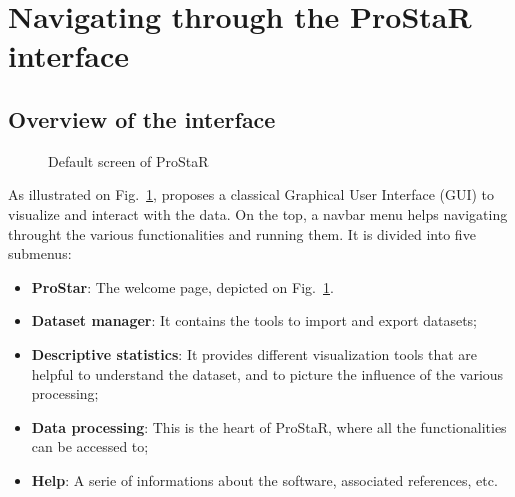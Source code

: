 \documentclass[12pt]{article}
\begin{document}

\section{Navigating through the ProStaR interface}

\subsection{Overview of the interface}

\begin{figure}
\centering
{}
\caption{Default screen of ProStaR}\label{fig:vuegal}
\end{figure}

{As illustrated on Fig.~\ref{fig:vuegal},  proposes a classical 
Graphical User Interface (GUI) to visualize and interact with the data. On 
the top, a navbar menu helps navigating throught the various  
functionalities and running them. It is divided into five submenus:
\begin{itemize}
\item \textbf {ProStar}: The welcome page, depicted on Fig.~\ref{fig:vuegal}.
\item \textbf {Dataset manager}: It contains the tools to import and export 
datasets;
\item \textbf {Descriptive statistics}: It provides different visualization 
tools that are helpful to understand the dataset, and to picture the 
influence of the various processing;
\item \textbf {Data processing}: This is the heart of ProStaR, where all 
the  functionalities can be accessed to; 
\item \textbf {Help}: A serie of informations about the software, 
associated references, etc.
\end{itemize}
}
\end{document}
